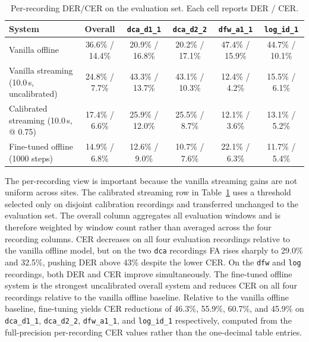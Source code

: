\documentclass[conference]{IEEEtran}
\begin{document}
\begin{table}[t]
\centering
\caption{Per-recording DER/CER on the evaluation set. Each cell reports DER / CER.}
\label{tab:per_recording_results}
\renewcommand{\arraystretch}{1.05}
\footnotesize
\begin{tabular}{@{}lccccc@{}}
\toprule
\textbf{System} & \textbf{Overall} & \textbf{\texttt{dca\_d1\_1}} & \textbf{\texttt{dca\_d2\_2}} & \textbf{\texttt{dfw\_a1\_1}} & \textbf{\texttt{log\_id\_1}} \\
\midrule
Vanilla offline & 36.6\% / 14.4\% & 20.9\% / 16.8\% & 20.2\% / 17.1\% & 47.4\% / 15.9\% & 44.7\% / 10.1\% \\
Vanilla streaming (10.0\,s, uncalibrated) & 24.8\% / 7.7\% & 43.3\% / 13.7\% & 43.1\% / 10.3\% & 12.4\% / 4.2\% & 15.5\% / 6.1\% \\
Calibrated streaming (10.0\,s, @ 0.75) & 17.4\% / 6.6\% & 25.9\% / 12.0\% & 25.5\% / 8.7\% & 12.1\% / 3.6\% & 13.1\% / 5.2\% \\
Fine-tuned offline (1000 steps) & 14.9\% / 6.8\% & 12.6\% / 9.0\% & 10.7\% / 7.6\% & 22.1\% / 6.3\% & 11.7\% / 5.4\% \\
\bottomrule
\end{tabular}
\vspace{-2mm}
\end{table}

The per-recording view is important because the vanilla streaming gains are
not uniform across sites. The calibrated streaming row in
Table~\ref{tab:per_recording_results} uses a threshold selected only on
disjoint calibration recordings and transferred unchanged to the evaluation
set. The overall column aggregates all evaluation windows and is therefore
weighted by window count rather than averaged across the four recording columns. CER decreases on all four evaluation recordings relative to the vanilla offline model, but on the two \texttt{dca} recordings FA rises sharply to 29.0\% and 32.5\%, pushing DER above 43\% despite the lower CER. On the \texttt{dfw} and \texttt{log} recordings, both DER and CER improve simultaneously. The fine-tuned offline system is the strongest uncalibrated overall system and reduces CER on all four recordings relative to the vanilla offline baseline. Relative to the vanilla offline baseline, fine-tuning yields CER reductions of 46.3\%, 55.9\%, 60.7\%, and 45.9\% on \texttt{dca\_d1\_1}, \texttt{dca\_d2\_2}, \texttt{dfw\_a1\_1}, and \texttt{log\_id\_1} respectively, computed from the full-precision per-recording CER values rather than the one-decimal table entries.
\end{document}
